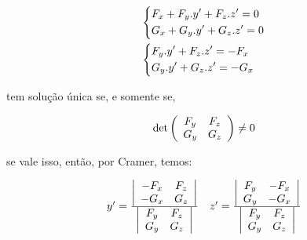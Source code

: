 \documentclass{book}
\begin{document}
\begin{sol}
\[
\begin{gathered}
\left\{ \begin{gathered}
F_x  + F_y .y' + F_z .z' = 0 \hfill \\
G_x  + G_y .y' + G_z .z' = 0 \hfill \\
\end{gathered}  \right. \hfill \\
\left\{ \begin{gathered}
F_y .y' + F_z .z' =  - F_x  \hfill \\
G_y .y' + G_z .z' =  - G_x  \hfill \\
\end{gathered}  \right. \hfill \\
\end{gathered}
\]

tem solu\c c\~ao \'unica se, e somente se,

\[
\det \left( {\begin{array}{*{20}c}
{F_y } & {F_z }  \\
{G_y } & {G_z }  \\

\end{array} } \right) \ne 0
\]

se vale isso, ent\~ao, por Cramer, temos:

\[
\begin{array}{*{20}c}
{y' = \frac{{\left| {\begin{array}{*{20}c}
{ - F_x } & {F_z }  \\
{ - G_x } & {G_z }  \\

\end{array} } \right|}}
{{\left| {\begin{array}{*{20}c}
{F_y } & {F_z }  \\
{G_y } & {G_z }  \\

\end{array} } \right|}}} & {z' = \frac{{\left| {\begin{array}{*{20}c}
{F_y } & { - F_x }  \\
{G_y } & { - G_x }  \\

\end{array} } \right|}}
{{\left| {\begin{array}{*{20}c}
{F_y } & {F_z }  \\
{G_y } & {G_z }  \\

\end{array} } \right|}}}  \\

\end{array}
\]

\end{sol}
\end{document}
